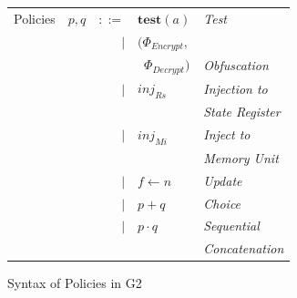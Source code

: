 \documentclass[sigconf,usenames,dvipsnames,svgnames,table]{acmart}
\def \sysname {\textsc{G2}\xspace}
\begin{document}
        \begin{figure}
          \centering
          \begin{tabular}{l c r l l}
            Policies  & $p,q$ & $::=$  & $\mathbf{test}(a)$ & \textit{Test}           \\
                      &       & $\mid$ & $(\Phi_{Encrypt},$ &                         \\
                      &       &        &\ $\Phi_{Decrypt})$ & \textit{Obfuscation}    \\
                      &       & $\mid$ & $inj_{Rs}$         & \textit{Injection to}   \\
                      &       &        &                    & \textit{State Register} \\
                      &       & $\mid$ & $inj_{Mi}$         & \textit{Inject to}      \\
                      &       &        &                    & \textit{Memory Unit}    \\
                      &       & $\mid$ & $f \leftarrow n$   & \textit{Update}         \\
                      &       & $\mid$ & $p + q$            & \textit{Choice}         \\
                      &       & $\mid$ & $p \cdot q$        & \textit{Sequential}     \\
                      &       &        &                    & \textit{Concatenation}  \\
          \end{tabular}
          \caption{Syntax of Policies in \sysname}
          \label{fig:spec:synt:pol}
        \end{figure}



\end{document}
